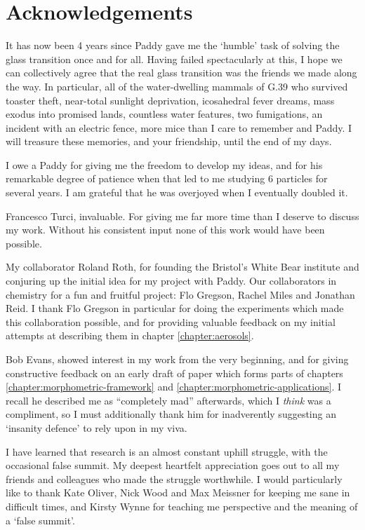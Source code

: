
\chapter*{Acknowledgements}

It has now been 4 years since Paddy gave me the `humble' task of solving the glass transition once and for all.
Having failed spectacularly at this, I hope we can collectively agree that the real glass transition was the friends we made along the way.
In particular, all of the water-dwelling mammals of G.39 who survived toaster theft, near-total sunlight deprivation, icosahedral fever dreams, mass exodus into promised lands, countless water features, two fumigations, an incident with an electric fence, more mice than I care to remember and Paddy.
I will treasure these memories, and your friendship, until the end of my days.

I owe a  Paddy for giving me the freedom to develop my ideas, and for his remarkable degree of patience when that led to me studying 6 particles for several years.
I am grateful that he was overjoyed when I eventually doubled it.

Francesco Turci, invaluable.
For giving me far more time than I deserve to discuss my work.
Without his consistent input none of this work would have been possible.

My collaborator Roland Roth, for founding the Bristol's White Bear institute and conjuring up the initial idea for my project with Paddy.
Our collaborators in chemistry for a fun and fruitful project: Flo Gregson, Rachel Miles and Jonathan Reid.
I thank Flo Gregson in particular for doing the experiments which made this collaboration possible, and for providing valuable feedback on my initial attempts at describing them in chapter \ref{chapter:aerosols}.

Bob Evans, showed interest in my work from the very beginning, and for giving constructive feedback on an early draft of paper which forms parts of chapters \ref{chapter:morphometric-framework} and \ref{chapter:morphometric-applications}.
I recall he described me as ``completely mad'' afterwards, which I \emph{think} was a compliment, so I must additionally thank him for inadverently suggesting an `insanity defence' to rely upon in my viva.

I have learned that research is an almost constant uphill struggle, with the occasional false summit.
My deepest heartfelt appreciation goes out to all my friends and colleagues who made the struggle worthwhile.
I would particularly like to thank Kate Oliver, Nick Wood and Max Meissner for keeping me sane in difficult times, and Kirsty Wynne for teaching me perspective and the meaning of a `false summit'.


